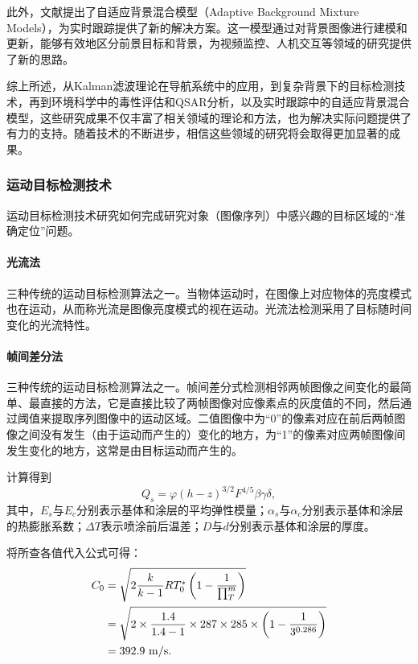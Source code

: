 此外，文献\cite{Stauffer1999}提出了自适应背景混合模型（Adaptive Background Mixture Models），为实时跟踪提供了新的解决方案。这一模型通过对背景图像进行建模和更新，能够有效地区分前景目标和背景，为视频监控、人机交互等领域的研究提供了新的思路。

综上所述，从Kalman滤波理论在导航系统中的应用，到复杂背景下的目标检测技术，再到环境科学中的毒性评估和QSAR分析，以及实时跟踪中的自适应背景混合模型，这些研究成果不仅丰富了相关领域的理论和方法，也为解决实际问题提供了有力的支持。随着技术的不断进步，相信这些领域的研究将会取得更加显著的成果。

\subsubsection{运动目标检测技术}

运动目标检测技术研究如何完成研究对象（图像序列）中感兴趣的目标区域的“准确定位”问题。

\paragraph{光流法}

三种传统的运动目标检测算法之一。当物体运动时，在图像上对应物体的亮度模式也在运动，从而称光流是图像亮度模式的视在运动。光流法检测采用了目标随时间变化的光流特性。

\paragraph{帧间差分法}

三种传统的运动目标检测算法之一。帧间差分式检测相邻两帧图像之间变化的最简单、最直接的方法，它是直接比较了两帧图像对应像素点的灰度值的不同，然后通过阈值来提取序列图像中的运动区域。二值图像中为“$0$”的像素对应在前后两帧图像之间没有发生（由于运动而产生的）变化的地方，为“1”的像素对应两帧图像间发生变化的地方，这常是由目标运动而产生的。

计算得到
\begin{equation}%
Q_s = \varphi(h-z)^{3/2}F^{4/5}\beta\gamma\delta,
\end{equation}
其中，$E_s$与$E_c$分别表示基体和涂层的平均弹性模量；$\alpha_s$与$\alpha_c$分别表示基体和涂层的热膨胀系数；$\Delta T$表示喷涂前后温差；$D$与$d$分别表示基体和涂层的厚度。

将所查各值代入公式可得：
\begin{align}%
  C_0 &= \sqrt{ 2\frac{k}{k-1}RT_0^{\ast}\left(1-\frac{1}{\prod_{T}^{m}}\right) } \notag \\
   &= \sqrt{ 2\times \frac{1.4}{1.4-1}\times 287\times 285\times \left( 1-\frac{1}{3^{0.286}} \right) } \notag \\
   &= 392.9~\unit{m/s}.
\end{align}

